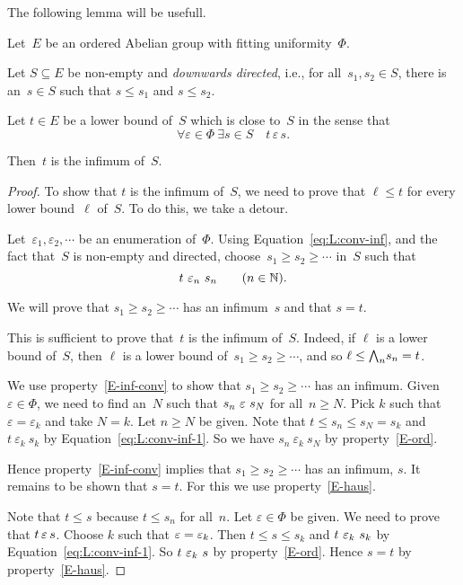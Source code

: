 \documentclass[main.tex]{subfiles}
\begin{document}
%
%
The following lemma will be usefull.
\begin{lem}
\label{lem:conv-inf}
Let~$E$ be an ordered Abelian group with 
fitting uniformity~$\Phi$.

Let $S\subseteq E$
be non-empty and \emph{downwards directed},
i.e., for all~$s_1,s_2\in S$,
there is an~$s\in S$ such that $s\leq s_1$
and $s\leq s_2$.

Let $t\in E$ be a lower bound of~$S$
which is close to~$S$ in the sense that
\begin{equation}
\label{eq:L:conv-inf}
\forall\varepsilon\in\Phi\ \exists s\in S\quad t\,\varepsilon\, s\text{.}
\end{equation}

Then~$t$ is the infimum of~$S$.
\end{lem}
\begin{proof}
To show that $t$ is the infimum of~$S$,
we need to prove that $\ell \leq t$
for every lower bound~$\ell$ of~$S$.
To do this, we take a detour.

Let~$\varepsilon_1,\varepsilon_2,\dotsb$
be an enumeration of~$\Phi$.
Using Equation~\eqref{eq:L:conv-inf},
and the fact that~$S$ is non-empty and directed,
choose~$s_1 \geq s_2 \geq \dotsb$ in~$S$
such that 
\begin{equation}
\label{eq:L:conv-inf-1}
t\ \varepsilon_n \ s_n\qquad(n\in \mathbb{N}).
\end{equation}

We will prove that
$s_1 \geq s_2 \geq \dotsb$
has an infimum~$s$ and that $s=t$.

This is sufficient to prove that~$t$ is the infimum of~$S$.
Indeed,
if $\ell$ is a lower bound of~$S$,
then $\ell$ is a lower bound of~$s_1 \geq s_2 \geq\dotsb$,
and so $\ell \leq \textstyle{\bigwedge}_n s_n =t$.

We use property~\ref{E-inf-conv}
to show that $s_1 \geq s_2 \geq\dotsb$
has an infimum.
Given $\varepsilon\in\Phi$,
we need to find an~$N$ such that $s_n \ \varepsilon\ s_N$
for all~$n\geq N$. Pick $k$ such that $\varepsilon=\varepsilon_k$
and take $N=k$. Let $n\geq N$ be given.
Note that $t \leq s_n \leq s_N =s_k$
and $t\ \varepsilon_k\ s_k$
by Equation~\eqref{eq:L:conv-inf-1}.
So we have $s_n\ \varepsilon_k\ s_N$ by property~\ref{E-ord}.

Hence property~\ref{E-inf-conv} implies that $s_1 \geq s_2 \geq \dotsb$
has an infimum, $s$.
It remains to be shown that $s=t$.
For this we use property~\ref{E-haus}.

Note that $t\leq s$ because $t\leq s_n$ for all~$n$.
Let $\varepsilon\in\Phi$ be given.
We need to prove that $t \,\varepsilon\, s$.
Choose $k$ such that $\varepsilon = \varepsilon_k$.
Then $t \leq s \leq s_k$
and $t \ \varepsilon_k\ s_k$
by Equation~\eqref{eq:L:conv-inf-1}.
So $t\ \varepsilon_k \  s$ by property~\ref{E-ord}.
Hence $s=t$ by property~\ref{E-haus}.
\end{proof}
%
%
\end{document}
